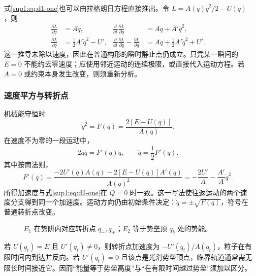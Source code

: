 式\eqref{sup1:eq:d1-one}也可以由拉格朗日方程直接推出。令 $L=A(q)\dot q^2/2-U(q)$，则
\[
\begin{aligned}
\frac{\partial L}{\partial\dot q}&=A\dot q,
&\frac{\dd}{\dd t}\frac{\partial L}{\partial\dot q}&=A\ddot q+A'\dot q^2,\\
\frac{\partial L}{\partial q}&=\frac12A'\dot q^2-U',
&\frac{\dd}{\dd t}\frac{\partial L}{\partial\dot q}-\frac{\partial L}{\partial q}
&=A\ddot q+\frac12A'\dot q^2+U'.
\end{aligned}
\]
这一推导未除以速度，因此在普通构形的瞬时静止点仍成立。只凭某一瞬间的 $\dot E=0$ 不能约去零速度；应使用邻近运动的连续极限，或直接代入运动方程。若 $A=0$ 或约束本身发生改变，则须重新分析。

\subsubsection{速度平方与转折点}
机械能守恒时
\begin{equation}\label{sup1:eq:d1-speed}
\dot q^2=F(q)=\frac{2[E-U(q)]}{A(q)}.
\end{equation}
在速度不为零的一段运动中，
\[
2\dot q\ddot q=F'(q)\dot q,
\qquad\boxed{\ddot q=\frac12F'(q)}.
\]
其中按商法则，
\[
F'(q)=\frac{-2U'(q)A(q)-2[E-U(q)]A'(q)}{A(q)^2}
=-\frac{2U'}A-\frac{A'}A\dot q^2.
\]
所得加速度与式\eqref{sup1:eq:d1-one}在 $Q=0$ 时一致。这一写法使往返运动的两个速度分支得到同一个加速度。运动方向仍由初始条件决定：$\dot q=\pm\sqrt{F(q)}$，符号在普通转折点改变。

\begin{figure}[H]\centering
{}
\caption{$E_1$ 在势阱内对应转折点 $q_-,q_+$；$E_2$ 等于势垒顶 $q_b$ 处的势能。}\label{sup1:fig:d1-energy}
\end{figure}

若 $U(q_t)=E$ 且 $U'(q_t)\ne0$，则转折点加速度为 $-U'(q_t)/A(q_t)$，粒子在有限时间内到达并反向。若 $U'(q_t)=0$ 且该点是光滑势垒顶点，临界轨道通常需无限长时间接近它。因而“能量等于势垒高度”与“在有限时间越过势垒”须加以区分。

